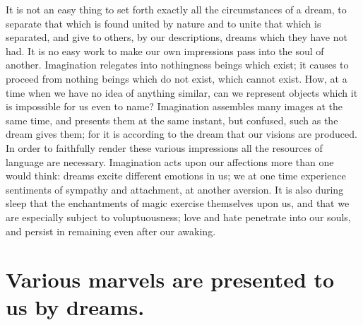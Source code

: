 \documentclass[12pt]{article}
\begin{document}
It is not an easy thing to set forth exactly all the circumstances of a dream,
to separate that which is found united by nature and to unite that which is
separated, and give to others, by our descriptions, dreams which they have not
had. It is no easy work to make our own impressions pass into the soul of
another. Imagination relegates into nothingness beings which exist; it causes
to proceed from nothing beings which do not exist, which cannot exist. How, at
a time when we have no idea of anything similar, can we represent objects which
it is impossible for us even to name? Imagination assembles many images at the
same time, and presents them at the same instant, but confused, such as the
dream gives them; for it is according to the dream that our visions are
produced. In order to faithfully render these various impressions all the
resources of language are necessary. Imagination acts upon our affections more
than one would think: dreams excite different emotions in us; we at one time
experience sentiments of sympathy and attachment, at another aversion. It is
also during sleep that the enchantments of magic exercise themselves upon us,
and that we are especially subject to voluptuousness; love and hate penetrate
into our souls, and persist in remaining even after our awaking.


\section{Various marvels are presented to us by dreams.}
\end{document}
